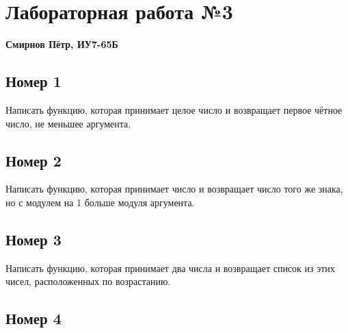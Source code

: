 \chapter{Лабораторная работа №3}

\textbf{Смирнов Пётр, ИУ7-65Б}

\section{Номер 1}

Написать функцию, которая принимает целое число и возвращает 
первое чётное число, не меньшее аргумента.

\begin{figure}[H]
    \begin{listingbox}{}
        
    \end{listingbox}
    \label{lst:1}
\end{figure}

\section{Номер 2}

Написать функцию, которая принимает число и возвращает 
число того же знака, но с модулем на 1 больше модуля аргумента.

\begin{figure}[H]
    \begin{listingbox}{}
        
    \end{listingbox}
    \label{lst:2}
\end{figure}

\section{Номер 3}

Написать функцию, которая принимает два числа и возвращает
список из этих чисел, расположенных по возрастанию.

\begin{figure}[H]
    \begin{listingbox}{}
        
    \end{listingbox}
    \label{lst:3}
\end{figure}

\section{Номер 4}

